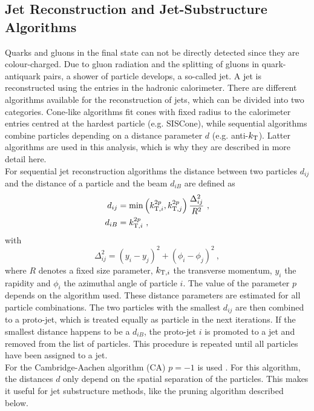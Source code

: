 \subsection{Jet Reconstruction and Jet-Substructure Algorithms}
\label{sec:jetreco}
Quarks and gluons in the final state can not be directly detected since they are colour-charged. Due to gluon radiation and the splitting of gluons in quark-antiquark pairs, a shower of particle develops, a so-called jet. A jet is reconstructed using the entries in the hadronic calorimeter. There are different algorithms available for the reconstruction of jets, which can be divided into two categories. Cone-like algorithms fit cones with fixed radius to the calorimeter entries centred at the hardest particle (e.g. SISCone), while sequential algorithms combine particles depending on a distance parameter $d$ (e.g. anti-$k_{\rm T}$). Latter algorithms are used in this analysis, which is why they are described in more detail here.\\

\noindent For sequential jet reconstruction algorithms the distance between two particles $d_{ij}$ and the distance of a particle and the beam $d_{iB}$ are defined as
\begin{align}
d_{ij} &= \min\left(k_{{\rm T},i}^{2p},k_{{\rm T},j}^{2p}\right)\frac{\Delta_{ij}^2}{R^2} ~, \\
d_{iB} &= k_{{\rm T},i}^{2p} ~,
\end{align}
with
\begin{equation}
\Delta_{ij}^2 = (y_i-y_j)^2 + (\phi_i - \phi_j)^2 ~, \label{eq:reco:deltar}
\end{equation}
where $R$ denotes a fixed size parameter, $k_{{\rm T},i}$ the transverse momentum, $y_i$ the rapidity and $\phi_i$ the azimuthal angle of particle $i$. The value of the parameter $p$ depends on the algorithm used. These distance parameters are estimated for all particle combinations. The two particles with the smallest $d_{ij}$ are then combined to a proto-jet, which is treated equally as particle in the next iterations. If the smallest distance happens to be a $d_{iB}$, the proto-jet $i$ is promoted to a jet and removed from the list of particles. This procedure is repeated until all particles have been assigned to a jet.\\

\noindent For the Cambridge-Aachen algorithm (CA) $p=-1$ is used \cite{CA}. For this algorithm, the distances $d$ only depend on the spatial separation of the particles. This makes it useful for jet substructure methods, like the pruning algorithm described below.\\

